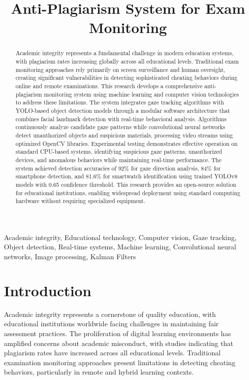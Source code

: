 \documentclass[conference]{IEEEtran}
\title{Anti-Plagiarism System for Exam Monitoring}
\author{
    \IEEEauthorblockN{Valentin Pletea-Marinescu}
    \IEEEauthorblockA{
        \textit{National University of Science and Technology POLITEHNICA Bucharest}\\
        Email: \texttt{pletea.valentin2003@gmail.com}
    }
}
\begin{document}
\maketitle

\begin{abstract}
Academic integrity represents a fundamental challenge in modern education systems, 
with plagiarism rates increasing globally across all educational levels. Traditional 
exam monitoring approaches rely primarily on screen surveillance and human oversight, 
creating significant vulnerabilities in detecting sophisticated cheating behaviors 
during online and remote examinations.
This research develops a comprehensive anti-plagiarism monitoring system using 
machine learning and computer vision technologies to address these limitations. 
The system integrates gaze tracking algorithms with YOLO-based object detection 
models through a modular software architecture that combines facial landmark 
detection with real-time behavioral analysis. Algorithms continuously analyze 
candidate gaze patterns while convolutional neural networks detect unauthorized objects 
and suspicious materials, processing video streams using optimized OpenCV libraries.
Experimental testing demonstrates effective operation on standard CPU-based 
systems, identifying suspicious gaze patterns, unauthorized devices, 
and anomalous behaviors while maintaining real-time performance. The system 
achieved detection accuracies of 92\% for gaze direction analysis, 84\% for smartphone detection, and 81.6\% for smartwatch identification using trained YOLOv8 models with 0.65 confidence threshold. This research 
provides an open-source solution for educational institutions, enabling 
widespread deployment using standard computing hardware without requiring specialized equipment.
\end{abstract}

\begin{IEEEkeywords}
Academic integrity, Educational technology, Computer vision, Gaze tracking, Object detection, Real-time systems, Machine learning, Convolutional neural networks, Image processing, Kalman Filters
\end{IEEEkeywords}

\section{Introduction}

Academic integrity represents a cornerstone of quality education, with educational 
institutions worldwide facing challenges in maintaining fair assessment 
practices. The proliferation of digital learning environments has amplified concerns 
about academic misconduct, with studies indicating that plagiarism rates have increased 
across all educational levels\cite{zimba2021plagiarism}. Traditional 
examination monitoring approaches present limitations 
in detecting cheating behaviors, particularly in remote and hybrid 
learning contexts\cite{nazari2019detection}.
\end{document}

